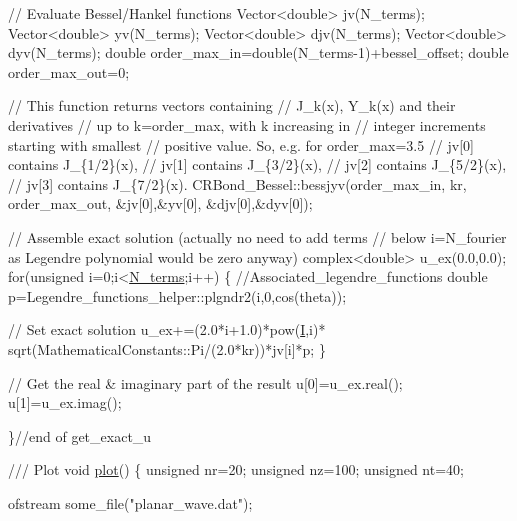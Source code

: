 \begin{DoxyCodeInclude}
  \textcolor{comment}{// Evaluate Bessel/Hankel functions}
  Vector<double> jv(N\_terms);
  Vector<double> yv(N\_terms);
  Vector<double> djv(N\_terms);
  Vector<double> dyv(N\_terms);
  \textcolor{keywordtype}{double} order\_max\_in=double(N\_terms-1)+bessel\_offset;
  \textcolor{keywordtype}{double} order\_max\_out=0;
  
  \textcolor{comment}{// This function returns vectors containing }
  \textcolor{comment}{// J\_k(x), Y\_k(x) and their derivatives}
  \textcolor{comment}{// up to k=order\_max, with k increasing in}
  \textcolor{comment}{// integer increments starting with smallest}
  \textcolor{comment}{// positive value. So, e.g. for order\_max=3.5}
  \textcolor{comment}{// jv[0] contains J\_\{1/2\}(x),}
  \textcolor{comment}{// jv[1] contains J\_\{3/2\}(x),}
  \textcolor{comment}{// jv[2] contains J\_\{5/2\}(x),}
  \textcolor{comment}{// jv[3] contains J\_\{7/2\}(x).}
  CRBond\_Bessel::bessjyv(order\_max\_in,
                         kr,
                         order\_max\_out,
                         &jv[0],&yv[0],
                         &djv[0],&dyv[0]);
  
  
  \textcolor{comment}{// Assemble  exact solution (actually no need to add terms}
  \textcolor{comment}{// below i=N\_fourier as Legendre polynomial would be zero anyway)}
  complex<double> u\_ex(0.0,0.0);
  \textcolor{keywordflow}{for}(\textcolor{keywordtype}{unsigned} i=0;i<\hyperlink{namespacePlanarWave_a56abdb2474ccaffd88346ee3607d8672}{N\_terms};i++)
   \{
    \textcolor{comment}{//Associated\_legendre\_functions}
    \textcolor{keywordtype}{double} p=Legendre\_functions\_helper::plgndr2(i,0,cos(theta));
    
    \textcolor{comment}{// Set exact solution}
    u\_ex+=(2.0*i+1.0)*pow(\hyperlink{namespacePlanarWave_a541691caf71477c8c389062797c0fdab}{I},i)*
     sqrt(MathematicalConstants::Pi/(2.0*kr))*jv[i]*p;
   \}
  
  \textcolor{comment}{// Get the real & imaginary part of the result}
  u[0]=u\_ex.real();
  u[1]=u\_ex.imag();
  
 \}\textcolor{comment}{//end of get\_exact\_u}

\textcolor{comment}{}
\textcolor{comment}{ /// Plot }
\textcolor{comment}{} \textcolor{keywordtype}{void} \hyperlink{namespacePlanarWave_afe1e9812d1b1dc40a89f7a1f18d1165f}{plot}()
 \{
  \textcolor{keywordtype}{unsigned} nr=20;
  \textcolor{keywordtype}{unsigned} nz=100;
  \textcolor{keywordtype}{unsigned} nt=40;

  ofstream some\_file(\textcolor{stringliteral}{"planar\_wave.dat"});


\end{DoxyCodeInclude}
